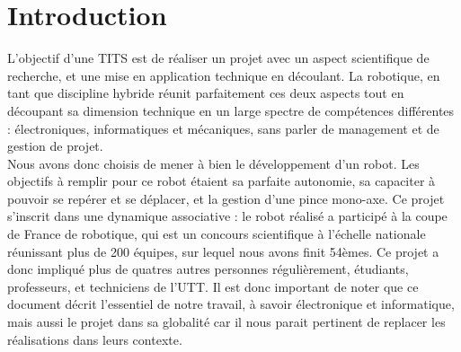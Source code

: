 \chapter{Introduction}
    L’objectif d’une TITS est de réaliser un projet avec un aspect scientifique de recherche, et
    une mise en application technique en découlant. La robotique, en tant que discipline hybride
    réunit parfaitement ces deux aspects tout en découpant sa dimension technique en un large
    spectre de compétences différentes : électroniques, informatiques et mécaniques, sans parler
    de management et de gestion de projet.\\

    Nous avons donc choisis de mener à bien le développement d’un robot. Les objectifs à
    remplir pour ce robot étaient sa parfaite autonomie, sa capaciter à pouvoir se repérer et se
    déplacer, et la gestion d’une pince mono-axe.
    Ce projet s’inscrit dans une dynamique associative : le robot réalisé a participé à la coupe de
    France de robotique, qui est un concours scientifique à l’échelle nationale réunissant plus de
    200 équipes, sur lequel nous avons finit 54èmes. Ce projet a donc impliqué plus de quatres
    autres personnes régulièrement, étudiants, professeurs, et techniciens de l’UTT. Il est donc
    important de noter que ce document décrit l’essentiel de notre travail, à savoir électronique
    et informatique, mais aussi le projet dans sa globalité car il nous parait pertinent de replacer
    les réalisations dans leurs contexte.